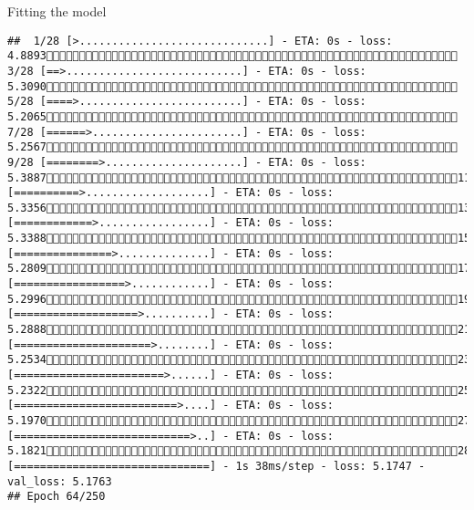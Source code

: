 \documentclass[
  ignorenonframetext,
]{beamer}
\begin{document}
\begin{frame}[fragile]{Fitting the model}
\begin{verbatim}
##  1/28 [>.............................] - ETA: 0s - loss: 4.8893 3/28 [==>...........................] - ETA: 0s - loss: 5.3090 5/28 [====>.........................] - ETA: 0s - loss: 5.2065 7/28 [======>.......................] - ETA: 0s - loss: 5.2567 9/28 [========>.....................] - ETA: 0s - loss: 5.388711/28 [==========>...................] - ETA: 0s - loss: 5.335613/28 [============>.................] - ETA: 0s - loss: 5.338815/28 [===============>..............] - ETA: 0s - loss: 5.280917/28 [=================>............] - ETA: 0s - loss: 5.299619/28 [===================>..........] - ETA: 0s - loss: 5.288821/28 [=====================>........] - ETA: 0s - loss: 5.253423/28 [=======================>......] - ETA: 0s - loss: 5.232225/28 [=========================>....] - ETA: 0s - loss: 5.197027/28 [===========================>..] - ETA: 0s - loss: 5.182128/28 [==============================] - 1s 38ms/step - loss: 5.1747 - val_loss: 5.1763
## Epoch 64/250

\end{verbatim}
\end{frame}
\end{document}
